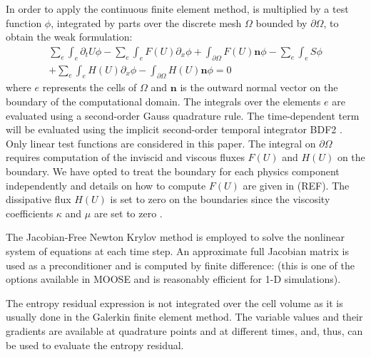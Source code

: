 \documentclass[review]{elsarticle}
\begin{document}
In order to apply the continuous finite element method,  is multiplied by a test function $\phi$, integrated by parts over the discrete mesh $\Omega$ bounded by $\partial \Omega$, to obtain the weak formulation:
\begin{multline}
\sum_e \int_{e} \partial_t U \phi - \sum_e \int_{e} F(U) \partial_x \phi + \int_{\partial \Omega} F(U) \mathbf{n} \phi - 
 \sum_e \int_{e} S \phi \\
 + \sum_e \int_{e} H(U) \partial_x \phi - \int_{\partial \Omega}H \left( U \right) \mathbf{n} \phi= 0
\end{multline}
where $e$ represents the cells of $\Omega$ and $\mathbf{n}$ is the outward normal vector on the boundary of the computational domain. 
The integrals over the elements $e$ are evaluated using a second-order Gauss quadrature rule. The time-dependent term will be evaluated using the implicit second-order temporal integrator BDF2 \cite{Leveque}. Only linear test functions are considered in this paper.
The integral on $\partial \Omega$ requires computation of the inviscid and viscous fluxes $F(U)$ and $H(U)$ on the boundary. We have opted to treat the boundary for each physics component independently and details on how to compute $F(U)$ are given in (REF). The dissipative flux $H(U)$ is set to zero on the boundaries since the viscosity coefficients $\kappa$ and $\mu$ are set to zero \cite{jlg1, jlg2, valentin}. 

The Jacobian-Free Newton Krylov method \cite{JFNK} is employed to solve the nonlinear system of equations at each time step.
An approximate full Jacobian matrix is used as a preconditioner and is computed by finite difference: (this is one of the options available in MOOSE and is reasonably efficient for 1-D simulations). 

\begin{remark}
The entropy residual expression is not integrated over the cell volume as it is usually done in the Galerkin finite element method. The variable values and their gradients are available at quadrature points and at different times, and, thus, can be used to evaluate the entropy residual. 
\end{remark}
%
\end{document}
